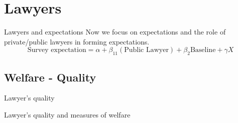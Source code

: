 \documentclass[8pt]{beamer}
\begin{document}
\section{Lawyers}

\begin{frame}{Lawyers and expectations}
    Now we focus on expectations and the role of private/public lawyers in forming expectations. 
\[\text{Survey expectation}= \alpha+\beta_11(\text{Public Lawyer}) + \beta_2 \text{Baseline} + \gamma X\]
\begin{table}[H]
      \centering
        \tiny{}
\end{table}

\end{frame}


\subsection{Welfare - Quality}
\begin{frame}{Lawyer's quality}

 \begin{table}[H] 
 \begin{subtable}{1.\textwidth}
 \begin{center}
 \tiny{}
 \end{center}
 \end{subtable}
 \end{table}  
 
\end{frame}


\begin{frame}{Lawyer's quality and measures of welfare}

 \begin{table}[H] 
 \begin{subtable}{1.\textwidth}
 \begin{center}
 \tiny{}
 \end{center}
 \end{subtable}
 \end{table}  
 
\end{frame}



 
\end{document}
